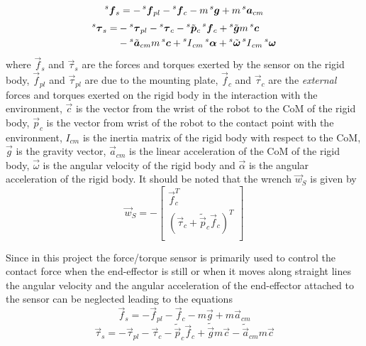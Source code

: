 \begin{equation}
  \prescript{s}{}{ \vec{f}}_{s} = -\prescript{s}{}{ \vec{f}}_{pl} -\prescript{s}{}{ \vec{f}}_{c} -m \prescript{s}{}{ \vec{g}}
  + m \prescript{s}{}{ \vec{a}}_{cm}
\end{equation}
\begin{equation}\label{eq:ne_torque_1}
  \begin{split}
  \prescript{s}{}{ \vec{\tau}}_{s} =& -\prescript{s}{}{ \vec{\tau}}_{pl} -\prescript{s}{}{ \vec{\tau}}_{c}
  - \prescript{s}{}{ \tilde{\vec{p}}}_{c} \prescript{s}{}{ \vec{f}}_{c}
  + \prescript{s}{}{ \tilde{\vec{g}}} m\prescript{s}{}{\vec{c}} \\
  & - \prescript{s}{}{ \tilde{\vec{a}}}_{cm} m \prescript{s}{}{ \vec{c}}
  + \prescript{s}{}{ I}_{cm} \prescript{s}{}{\vec{\alpha}}
  + \prescript{s}{}{ \tilde{\vec{\omega}}} \prescript{s}{}{ I}_{cm} \prescript{s}{}{ \vec{\omega}}\\
  \end{split}
\end{equation}
where
$\vec{f}_{s}$ and $\vec{\tau}_{s}$ are the forces and torques exerted by the sensor on the rigid body,
$\vec{f}_{pl}$ and $\vec{\tau}_{pl}$ are due to the mounting plate,
$\vec{f}_{c}$ and $\vec{\tau}_{c}$ are the \emph{external} forces and torques exerted on the rigid body in the interaction
with the environment,
$\vec{c}$ is the vector from the wrist of the robot to the CoM of the rigid body,
$\vec{p}_{c}$ is the vector from wrist of the robot to the contact point with the environment,
$I_{cm}$ is the inertia matrix of the rigid body with respect to the CoM,
$\vec{g}$ is the gravity vector, $\vec{a}_{cm}$ is the linear acceleration of the CoM of the rigid body,
$\vec{\omega}$ is the angular velocity of the rigid body and
$\vec{\alpha}$ is the angular acceleration of the rigid body.
It should be noted that the wrench $\vec{w}_{S}$  is given by
\[
\vec{w}_{S} = -
\begin{bmatrix}
  \vec{f}_{c} ^T \\
  (\vec{\tau}_{c} +\tilde{\vec{p}}_{c} \vec{f}_{c})^T\\
\end{bmatrix}
\]
\par
Since in this project the force/torque sensor is primarily used to control the contact force when the end-effector
is still or when it moves along straight lines the angular velocity and the angular acceleration of the end-effector
attached to the sensor can be neglected leading to the equations
\begin{equation}
  \label{eq:ne_force_2}
   \vec{f}_{s} = - \vec{f}_{pl} - \vec{f}_{c} -m  \vec{g} + m  \vec{a}_{cm}
\end{equation}
\begin{equation}
  \label{eq:ne_torque_2}
   \vec{\tau}_{s} = - \vec{\tau}_{pl} - \vec{\tau}_{c} - \tilde{\vec{p}}_{c}  \vec{f}_{c}
   + \tilde{\vec{g}} m\vec{c} -  \tilde{\vec{a}}_{cm} m  \vec{c}
\end{equation}

